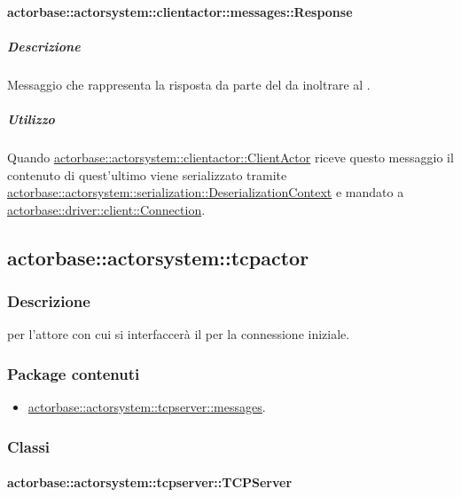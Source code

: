 \documentclass{scalatekids-article}
\begin{document}
\paragraph{actorbase::actorsystem::clientactor::messages::Response}
\label{sec:actorbase::actorsystem::clientactor::messages::Response}

\subparagraph{Descrizione}

Messaggio che rappresenta la risposta da parte del  da inoltrare
al .

\subparagraph{Utilizzo}

Quando \hyperref[sec:actorbase::actorsystem::clientactor::ClientActor]{actorbase::actorsystem::clientactor::ClientActor}
riceve questo messaggio il contenuto di quest'ultimo viene serializzato tramite
\hyperref[sec:actorbase::actorsystem::serialization::DeserializationContext]{actorbase::actorsystem::serialization::DeserializationContext}
e mandato a \hyperref[sec:actorbase::driver::client::Connection]{actorbase::driver::\allowbreak{}client::\allowbreak{}Connection}.

\subsection{actorbase::actorsystem::tcpactor}
\label{sec:actorbase::actorsystem::tcpactor}

\subsubsection{Descrizione}

 per l'attore con cui si interfaccerà il  per la connessione iniziale.

\subsubsection{Package contenuti}

\begin{itemize}
\item \hyperref[sec:actorbase::actorsystem::tcpserver::messages]{actorbase::actorsystem::tcpserver::messages}.
\end{itemize}

\subsubsection{Classi}

\paragraph{actorbase::actorsystem::tcpserver::TCPServer}
\label{sec:actorbase::actorsystem::tcpserver::TCPServer}
\end{document}
